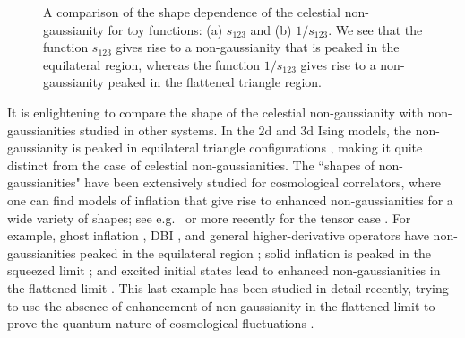 \documentclass[letterpaper,11pt]{article}
\begin{document}
\begin{figure}[t]
\begin{center}
\qquad
{}
\end{center}
\caption{
%
A comparison of the shape dependence of the celestial non-gaussianity for toy functions:  (a) $s_{123}$ and (b) $1/s_{123}$.  We see that the function $s_{123}$ gives rise to a non-gaussianity that is peaked in the equilateral region, whereas the function $1/s_{123}$ gives rise to a non-gaussianity peaked in the flattened triangle region. }
\label{fig:toy}
\end{figure}



It is enlightening to compare the shape of the celestial non-gaussianity with non-gaussianities studied in other systems.
%
In the 2d and 3d Ising models, the non-gaussianity is peaked in equilateral triangle configurations \cite{Rychkov:2016mrc}, making it quite distinct from the case of celestial non-gaussianities.
%
The ``shapes of non-gaussianities" have been extensively studied for cosmological correlators, where one can find models of inflation that give rise to enhanced non-gaussianities for a wide variety of shapes; see e.g.~\cite{Babich:2004gb,Chen:2006nt} or more recently for the tensor case \cite{Cabass:2021fnw}.
%
For example, ghost inflation \cite{Arkani-Hamed:2003juy}, DBI \cite{Alishahiha:2004eh,Silverstein:2003hf}, and general higher-derivative operators have non-gaussianities peaked in the equilateral region \cite{Babich:2004gb,Chen:2006nt,Baumann:2011su}; solid inflation is peaked in the squeezed limit \cite{Endlich:2012pz}; and excited initial states lead to enhanced non-gaussianities in the flattened limit \cite{Chen:2006nt,Holman:2007na,Meerburg:2009ys,LopezNacir:2011kk,Flauger:2013hra,Green:2020whw,Green:2022fwg}.
%
This last example has been studied in detail recently, trying to use the absence of enhancement of non-gaussianity in the flattened limit to prove the quantum nature of cosmological fluctuations \cite{Green:2020whw,Green:2022fwg}.
\end{document}
